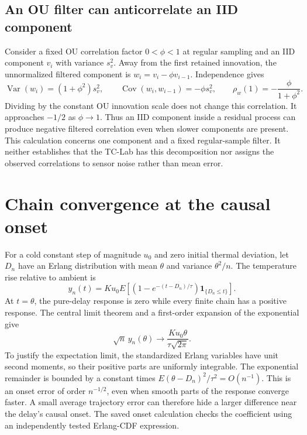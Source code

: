 \subsection{An OU filter can anticorrelate an IID component}
Consider a fixed OU correlation factor $0<\phi<1$ at regular sampling and an
IID component $v_i$ with variance $s_v^2$. Away from the first retained
innovation, the unnormalized filtered component is $w_i=v_i-\phi v_{i-1}$.
Independence gives
\[
 \operatorname{Var}(w_i)=(1+\phi^2)s_v^2,\qquad
 \operatorname{Cov}(w_i,w_{i-1})=-\phi s_v^2,\qquad
 \rho_w(1)=-\frac{\phi}{1+\phi^2}.
\]
Dividing by the constant OU innovation scale does not change this correlation.
It approaches $-1/2$ as $\phi\to1$. Thus an IID component inside a residual
process can produce negative filtered correlation even when slower components
are present. This calculation concerns one component and a fixed regular-sample
filter. It neither establishes that the TC-Lab has this decomposition nor
assigns the observed correlations to sensor noise rather than mean error.

\section{Chain convergence at the causal onset}
\label{sec:onset}
For a cold constant step of magnitude $u_0$ and zero initial thermal deviation,
let $D_n$ have an Erlang
distribution with mean $\theta$ and variance $\theta^2/n$. The temperature
rise relative to ambient is
\[
 y_n(t)=K u_0 E\!\left[
  \left(1-e^{-(t-D_n)/\tau}\right)\mathbf 1_{\{D_n\leq t\}}\right].
\]
At $t=\theta$, the pure-delay response is zero while every finite chain has a
positive response. The central limit theorem and a first-order expansion of
the exponential give
\[
 \sqrt n\,y_n(\theta)\longrightarrow
 \frac{K u_0\theta}{\tau\sqrt{2\pi}}.
\]
To justify the expectation limit, the standardized Erlang variables have unit
second moments, so their positive parts are uniformly integrable. The
exponential remainder is bounded by a constant times
$E(\theta-D_n)^2/\tau^2=O(n^{-1})$.
This is an onset error of order $n^{-1/2}$, even when smooth parts of the
response converge faster. A small average trajectory error can therefore hide
a larger difference near the delay's causal onset. The saved onset calculation
checks the coefficient using an independently tested Erlang-CDF expression.
